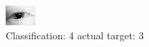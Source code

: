 \begin{figure}[h!]
\begin{center}
\includegraphics[width=0.60\columnwidth]{figures/ID20_class_4_target_3.png}
\end{center}
\caption{ Classification: 4 actual target: 3}
\label{fig:ID20_class_4_target_3}
\end{figure}
